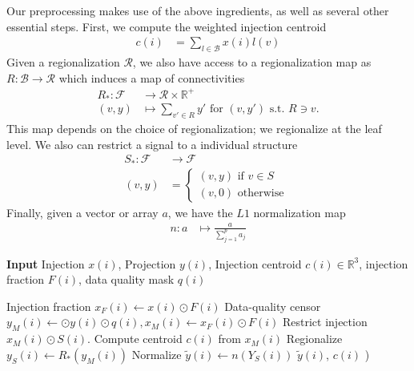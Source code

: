 Our preprocessing makes use of the above ingredients, as well as several other essential steps.
First, we compute the weighted injection centroid
\begin{eqnarray*}
c(i) &= \sum_{l \in \mathcal B} x(i) l(v) 
\end{eqnarray*}
Given a regionalization $\mathcal R$, we also have access to a regionalization map as $R: \mathcal B  \to \mathcal R $ which induces a map of connectivities 
\begin{eqnarray*}
R_*: \mathcal F &\to \mathcal R \times \mathbb R^+ \\
(v, y) &\mapsto \sum_{v' \in R} y'  \text{ for } (v,y') \text{ s.t. } R \ni v.
\end{eqnarray*}
This map depends on the choice of regionalization; we regionalize at the leaf level.
We also can restrict a signal to a individual structure
\begin{eqnarray*}
S_* :  \mathcal F &\to  \mathcal F \\
 (v, y) &= \begin{cases} 
 (v, y) \text{ if } v \in S \\
 (v, 0) \text{ otherwise }
 \end{cases}
\end{eqnarray*}
Finally, given a vector or array $a$, we have the $L1$ normalization map
\begin{eqnarray*}
n: a &\mapsto \frac{a}{\sum_{j = 1}^p a_j}
\end{eqnarray*}

\begin{algorithm}[H]
\begin{algorithmic}
\caption{{\bf Input} Injection $x(i)$, Projection $y(i)$, Injection centroid $c(i) \in \mathbb R^3$, injection fraction $F(i)$, data quality mask $q(i)$}
\State Injection fraction $x_F(i) \gets x(i) \odot F(i)$
\State Data-quality censor $y_M (i) \gets  \odot y(i) \odot q(i) , x_M(i) \gets x_F(i) \odot F(i)$
\State Restrict injection $x_M(i)  \odot S(i)$.
\State Compute centroid $c(i)$ from $x_M(i) $
\State Regionalize $y_S (i) \gets R_*(  y_M(i))$
\State Normalize $\tilde y(i) \gets n(Y_S(i))$
 $\tilde y(i)$, $c(i)$ )  
\end{algorithmic}
\label{alg:preprocess}
\end{algorithm}



